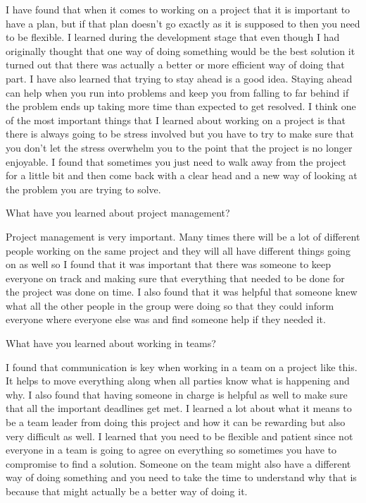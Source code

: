 \documentclass[letterpaper, 10pt, draftclsnofoot, compsoc, onecolumn]{IEEEtran}
\begin{document}
I have found that when it comes to working on a project that it is important to have a plan, but if that plan doesn't go exactly as it is supposed to then you need to be flexible. I learned during the development stage that even though I had originally thought that one way of doing something would be the best solution it turned out that there was actually a better or more efficient way of doing that part. I have also learned that trying to stay ahead is a good idea. Staying ahead can help when you run into problems and keep you from falling to far behind if the problem ends up taking more time than expected to get resolved. I think one of the most important things that I learned about working on a project is that there is always going to be stress involved but you have to try to make sure that you don't let the stress overwhelm you to the point that the project is no longer enjoyable. I found that sometimes you just need to walk away from the project for a little bit and then come back with a clear head and a new way of looking at the problem you are trying to solve.

What have you learned about project management?

Project management is very important. Many times there will be a lot of different people working on the same project and they will all have different things going on as well so I found that it was important that there was someone to keep everyone on track and making sure that everything that needed to be done for the project was done on time. I also found that it was helpful that someone knew what all the other people in the group were doing so that they could inform everyone where everyone else was and find someone help if they needed it. 

What have you learned about working in teams?

I found that communication is key when working in a team on a project like this. It helps to move everything along when all parties know what is happening and why. I also found that having someone in charge is helpful as well to make sure that all the important deadlines get met. I learned a lot about what it means to be a team leader from doing this project and how it can be rewarding but also very difficult as well. I learned that you need to be flexible and patient since not everyone in a team is going to agree on everything so sometimes you have to compromise to find a solution. Someone on the team might also have a different way of doing something and you need to take the time to understand why that is because that might actually be a better way of doing it. 
\end{document}
